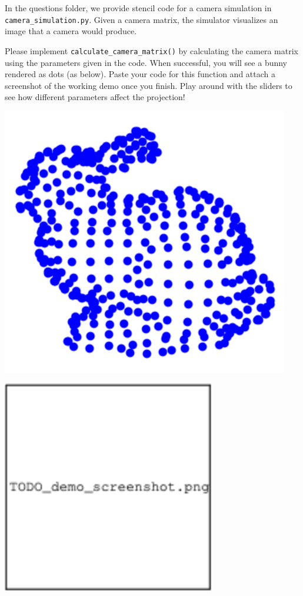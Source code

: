 \documentclass{csci1430}
\begin{document}
\begin{answer}[height=12]
\end{answer}


\pagebreak

\begin{subquestion}[points=4,drawbox=false]
In the questions folder, we provide stencil code for a camera simulation in \texttt{camera\_simulation.py}. Given a camera matrix, the simulator visualizes an image that a camera would produce. 
\end{subquestion}

\begin{orangebox}
Please implement \texttt{calculate\_camera\_matrix()} by calculating the camera matrix using the parameters given in the code. When successful, you will see a bunny rendered as dots (as below). Paste your code for this function and attach a screenshot of the working demo once you finish. Play around with the sliders to see how different parameters affect the projection!
\end{orangebox}

\includegraphics[width=0.5\linewidth]{images/bunny.png}

\begin{answer}
\includegraphics[width=0.7\textwidth,keepaspectratio]{images/TODO_demo_screenshot.png}
\end{answer}
\end{document}
